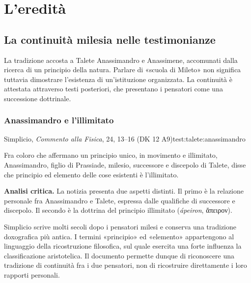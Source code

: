 \section{L'eredità}

\subsection{La continuità milesia nelle testimonianze}

La tradizione accosta a Talete Anassimandro e Anassimene, accomunati dalla ricerca di un principio della natura. Parlare di «scuola di Mileto» non significa tuttavia dimostrare l'esistenza di un'istituzione organizzata. La continuità è attestata attraverso testi posteriori, che presentano i pensatori come una successione dottrinale.

\subsubsection{Anassimandro e l'illimitato}

\begin{testimonianza}{Simplicio, \emph{Commento alla Fisica}, 24, 13--16 (DK 12 A9)}{test:talete:anassimandro}
\smallskip
{}\par
Fra coloro che affermano un principio unico, in movimento e illimitato, Anassimandro, figlio di Prassiade, milesio, successore e discepolo di Talete, disse che principio ed elemento delle cose esistenti è l'illimitato.
\end{testimonianza}


\noindent\textbf{Analisi critica.}
La notizia presenta due aspetti distinti. Il primo è la relazione personale fra Anassimandro e Talete, espressa dalle qualifiche di successore e discepolo. Il secondo è la dottrina del principio illimitato (\emph{ápeiron}, ἄπειρον).

Simplicio scrive molti secoli dopo i pensatori milesi e conserva una tradizione doxografica più antica. I termini «principio» ed «elemento» appartengono al linguaggio della ricostruzione filosofica, sul quale esercita una forte influenza la classificazione aristotelica. Il documento permette dunque di riconoscere una tradizione di continuità fra i due pensatori, non di ricostruire direttamente i loro rapporti personali.


